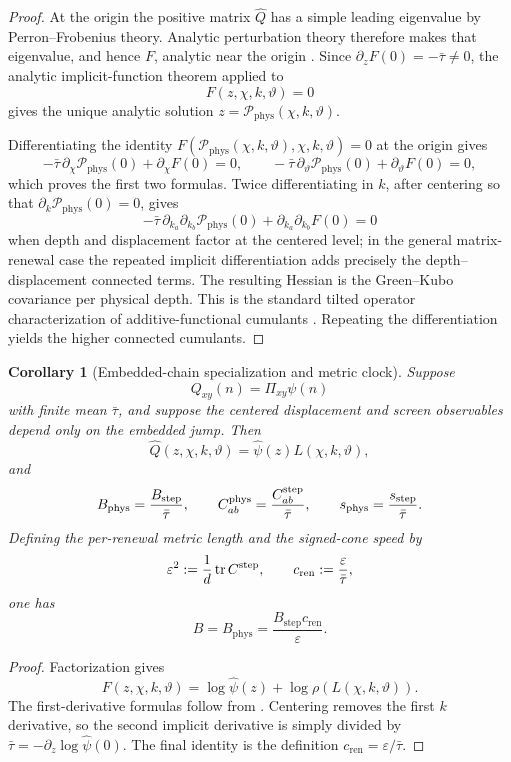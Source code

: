 \documentclass[11pt]{article}
\newtheorem{corollary}[theorem]{Corollary}
\theoremstyle{definition}
\theoremstyle{remark}
\newcommand{\eps}{\varepsilon}
\newcommand{\tr}{\operatorname{tr}}
\newcommand{\ren}{\mathrm{ren}}
\newcommand{\Bstep}{B_{\mathrm{step}}}
\newcommand{\Bphys}{B_{\mathrm{phys}}}
\newcommand{\bartau}{\bar\tau}
\newcommand{\Qhat}{\widehat Q}
\newcommand{\Pphys}{\mathcal P_{\mathrm{phys}}}
\begin{document}
\begin{proof}
At the origin the positive matrix \(\Qhat\) has a simple leading eigenvalue by
Perron--Frobenius theory.  Analytic perturbation theory therefore makes that
eigenvalue, and hence \(F\), analytic near the origin
\cite{Kato,EvansHoeghKrohn}.  Since
\(\partial_zF(0)=-\bartau\ne0\), the analytic implicit-function theorem applied
to
\[
   F(z,\chi,k,\vartheta)=0
\]
gives the unique analytic solution \(z=\Pphys(\chi,k,\vartheta)\).

Differentiating the identity
\(F(\Pphys(\chi,k,\vartheta),\chi,k,\vartheta)=0\) at the origin gives
\[
 -\bartau\,\partial_\chi\Pphys(0)+\partial_\chi F(0)=0,
 \qquad
 -\bartau\,\partial_\vartheta\Pphys(0)
       +\partial_\vartheta F(0)=0,
\]
which proves the first two formulas.  Twice differentiating in \(k\), after
centering so that \(\partial_k\Pphys(0)=0\), gives
\[
 -\bartau\,\partial_{k_a}\partial_{k_b}\Pphys(0)
 +\partial_{k_a}\partial_{k_b}F(0)=0
\]
when depth and displacement factor at the centered level; in the general
matrix-renewal case the repeated implicit differentiation adds precisely the
depth--displacement connected terms.  The resulting Hessian is the
Green--Kubo covariance per physical depth.  This is the standard tilted
operator characterization of additive-functional cumulants
\cite{Nagaev,KipnisVaradhan}.  Repeating the differentiation yields the higher
connected cumulants.
\end{proof}

\begin{corollary}[Embedded-chain specialization and metric clock]
\label{cor:embedded-renewal-dictionary}
Suppose
\[
   Q_{xy}(n)=\Pi_{xy}\psi(n)
\]
with finite mean \(\bartau\), and suppose the centered displacement and screen
observables depend only on the embedded jump.  Then
\[
 \Qhat(z,\chi,k,\vartheta)
 =\widehat\psi(z)L(\chi,k,\vartheta),
\]
and
\[
 \Bphys=\frac{\Bstep}{\bartau},
 \qquad
 C^{\rm phys}_{ab}=\frac{C^{\rm step}_{ab}}{\bartau},
 \qquad
 s_{\rm phys}=\frac{s_{\rm step}}{\bartau}.
\]
Defining the per-renewal metric length and the signed-cone speed by
\[
 \eps^2:=\frac1d\tr C^{\rm step},
 \qquad
 c_{\ren}:=\frac{\eps}{\bartau},
\]
one has
\[
 \boxed{\quad
 B=\Bphys=\frac{\Bstep c_{\ren}}{\eps}.
 \quad}
\]
\end{corollary}

\begin{proof}
Factorization gives
\[
 F(z,\chi,k,\vartheta)
 =\log\widehat\psi(z)
  +\log\rho(L(\chi,k,\vartheta)).
\]
The first-derivative formulas follow from
.  Centering removes the first \(k\)
derivative, so the second implicit derivative is simply divided by
\(\bartau=-\partial_z\log\widehat\psi(0)\).  The final identity is the
definition \(c_{\ren}=\eps/\bartau\).
\end{proof}
\end{document}

